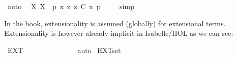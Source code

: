 \begin{isabellebody}
\ auto\ %
%
\endisatagproof
{\isafoldproof}%
%
\isadelimproof
\isanewline
%
\endisadelimproof
{}\isamarkupfalse%
\ {\isachardoublequoteopen}{\isasymlfloor}{\isacharparenleft}{\isacharparenleft}{\isasymlambda}X{\isachardot}\ \isactrlbold {\isasymbox}{\isacharparenleft}X\ \ {\isacharparenleft}p{\isacharcolon}{\isacharcolon}{\isasymup}{\isasymzero}{\isacharparenright}{\isacharparenright}{\isacharparenright}\ \isactrlbold {\isasymdown}{\isacharparenleft}{\isasymlambda}x{\isachardot}\ \isactrlbold {\isasymdiamond}{\isacharparenleft}{\isasymlambda}z{\isachardot}\ z\ \isactrlbold {\isasymapprox}\isactrlsup C\ x{\isacharparenright}\ p{\isacharparenright}{\isacharparenright}{\isasymrfloor}{\isachardoublequoteclose}\ \isanewline
%
\isadelimproof
\ \ %
\endisadelimproof
%
\isatagproof
{}\isamarkupfalse%
\ simp\ \ %
%
\endisatagproof
{\isafoldproof}%
%
\isadelimproof
%
\endisadelimproof
%
\isamarkuptrue%
%
\begin{isamarkuptext}%
In the book, extensionality is assumed (globally) for extensional terms. Extensionality is however
   already implicit in Isabelle/HOL as we can see:%
\end{isamarkuptext}\isamarkuptrue%
\isamarkupfalse%
\ EXT{\isacharcolon}\ {\isachardoublequoteopen}{\isasymforall}{\isasymalpha}{\isacharcolon}{\isacharcolon}{\isasymlangle}{\isasymzero}{\isasymrangle}{\isachardot}\ {\isasymforall}{\isasymbeta}{\isacharcolon}{\isacharcolon}{\isasymlangle}{\isasymzero}{\isasymrangle}{\isachardot}\ {\isacharparenleft}{\isasymforall}{\isasymgamma}{\isacharcolon}{\isacharcolon}{\isasymzero}{\isachardot}\ {\isacharparenleft}{\isasymalpha}\ {\isasymgamma}\ {\isasymlongleftrightarrow}\ {\isasymbeta}\ {\isasymgamma}{\isacharparenright}{\isacharparenright}\ {\isasymlongrightarrow}\ {\isacharparenleft}{\isasymalpha}\ {\isacharequal}\ {\isasymbeta}{\isacharparenright}{\isachardoublequoteclose}%
\isadelimproof
\ %
\endisadelimproof
%
\isatagproof
{}\isamarkupfalse%
\ auto%
\endisatagproof
{\isafoldproof}%
%
\isadelimproof
%
\endisadelimproof
\isanewline
{}\isamarkupfalse%
\ EXT{\isacharunderscore}set{\isacharcolon}\ {\isachardoublequoteopen}{\isasymforall}{\isasymalpha}{\isacharcolon}{\isacharcolon}{\isasymlangle}{\isasymlangle}{\isasymzero}{\isasymrangle}{\isasymrangle}{\isachardot}\ {\isasymforall}{\isasymbeta}{\isacharcolon}{\isacharcolon}{\isasymlangle}{\isasymlangle}{\isasymzero}{\isasymrangle}{\isasymrangle}{\isachardot}\ {\isacharparenleft}{\isasymforall}{\isasymgamma}{\isacharcolon}{\isacharcolon}{\isasymlangle}{\isasymzero}{\isasymrangle}{\isachardot}\ {\isacharparenleft}{\isasymalpha}\ {\isasymgamma}\ {\isasymlongleftrightarrow}\ {\isasymbeta}\ {\isasymgamma}{\isacharparenright}{\isacharparenright}\ {\isasymlongrightarrow}\ {\isacharparenleft}{\isasymalpha}\ {\isacharequal}\ {\isasymbeta}{\isacharparenright}{\isachardoublequoteclose}\ \isanewline

\end{isabellebody}
